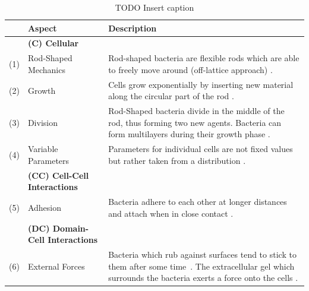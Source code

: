 \documentclass{article}
\begin{document}
\begin{table}
    \centering
    \def\arraystretch{1.3}
    \begin{tabularx}{\textwidth}{c l X}
        &\textbf{Aspect} & \textbf{Description}\\
        \toprule
        &\textbf{(C) Cellular}\\
        \midrule
        (1) & Rod-Shaped Mechanics &
            Rod-shaped bacteria are flexible rods which are able to freely move around (off-lattice
            approach) \cite{Takeuchi2005,Ursell2014,Amir2014_2}.\\
        (2) & Growth &
            Cells grow exponentially by inserting new material along the circular part of the rod
            \cite{Robert2014,Takeuchi2005}.\\
        (3) & Division &
            Rod-Shaped bacteria divide in the middle of the rod, thus forming two new
            agents.
            Bacteria can form multilayers during their growth phase \cite{Duvernoy2018}.\\
        (4) & Variable Parameters &
            Parameters for individual cells are not fixed values but rather taken from a
            distribution \cite{Koutsoumanis2013}.\\
        &\textbf{(CC) Cell-Cell Interactions}\\
        \midrule
        (5) & Adhesion &
            Bacteria adhere to each other at longer distances and attach when in close contact
            \cite{Verwey1947,Trejo2013}.\\
        &\textbf{(DC) Domain-Cell Interactions}\\
        \midrule
        (6) & External Forces &
            Bacteria which rub against surfaces tend to stick to them after some
            time~\cite{vanLoosdrecht1989}.
            The extracellular gel which surrounds the bacteria exerts a force onto the cells
            \cite{Grant2014}.\\
        \bottomrule
    \end{tabularx}
    \label{table:simulation-aspects}
    \caption{TODO Insert caption}
\end{table}
\end{document}
